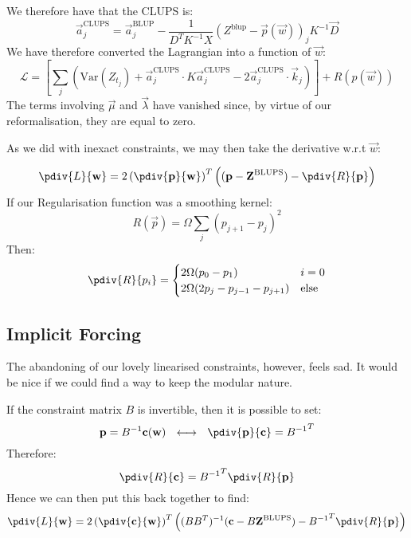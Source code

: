 \documentclass[]{article}
\begin{document}
			We therefore have that the CLUPS is:
			\begin{equation}
				\vec{a}^\text{CLUPS}_j = \vec{a}^\text{BLUP}_j - \frac{1}{D^T K^{-1} X} \left(Z^\text{blup} - \vec{p}(\vec{w})\right)_j K^{-1} \vec{D}
			\end{equation}
			We have therefore converted the Lagrangian into a function of $\vec{w}$:
			\begin{equation}
				\mathcal{L} = \left[ \sum_j \left(\text{Var}(Z_{t_j}) + \vec{a}^\text{CLUPS}_j \cdot K \vec{a}^\text{CLUPS}_j - 2 \vec{a}^\text{CLUPS}_j \cdot \vec{k}_j \right) \right] + R(p(\vec{w}))
			\end{equation}
			The terms involving $\vec{\mu}$ and $\vec{\lambda}$ have vanished since, by virtue of our reformalisation, they are equal to zero.

			As we did with inexact constraints, we may then take the derivative w.r.t $\vec{w}$:

			\begin{equation}
					\pdiv{L}{\vec{w}} = 2\left(\pdiv{\vec{p}}{\vec{w}}\right)^T \left((\vec{p} - \vec{Z}^\text{BLUPS}) - \pdiv{R}{\vec{p}} \right)
			\end{equation}
			If our Regularisation function was a smoothing kernel:
			\begin{equation}
				R(\vec{p}) = \Omega \sum_j (p_{j+1} - p_j)^2
			\end{equation}
			Then:
			\begin{equation}
				\pdiv{R}{p_i} = \begin{cases}
					2\Omega (p_0 - p_1) & i = 0
					\\
					2\Omega (2p_j - p_{j-1} - p_{j+1}) & \text{else}
				\end{cases}
			\end{equation}
		\subsection{Implicit Forcing}

			The abandoning of our lovely linearised constraints, however, feels sad. It would be nice if we could find a way to keep the modular nature. 

			If the constraint matrix $B$ is invertible, then it is possible to set:
			\begin{equation}
				\vec{p} = B^{-1} \vec{c}(\vec{w}) ~~\longleftrightarrow~~ \pdiv{\vec{p}}{\vec{c}} = {B^{-1}}^T
			\end{equation}
			Therefore:
			\begin{equation}
				\pdiv{R}{\vec{c}} = {B^{-1}}^T \pdiv{R}{\vec{p}}
			\end{equation}
			Hence we can then put this back together to find:
			\begin{equation}
				\pdiv{L}{\vec{w}} = 2\left(\pdiv{\vec{c}}{\vec{w}}\right)^T \left((BB^T)^{-1}(\vec{c} - B\vec{Z}^\text{BLUPS}) - {B^{-1}}^T\pdiv{R}{\vec{p}} \right)
		\end{equation}
\end{document}
